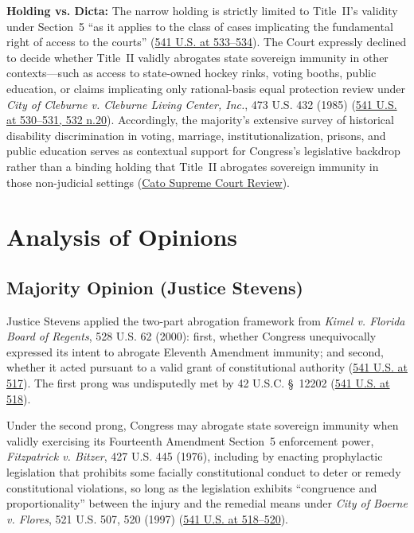 \documentclass[12pt]{article}
\begin{document}
\textbf{Holding vs. Dicta:} The narrow holding is strictly limited to Title~II's validity under Section~5 ``as it applies to the class of cases implicating the fundamental right of access to the courts'' (\href{https://www.law.cornell.edu/supremecourt/text/541/509}{541 U.S. at 533--534}). The Court expressly declined to decide whether Title~II validly abrogates state sovereign immunity in other contexts---such as access to state-owned hockey rinks, voting booths, public education, or claims implicating only rational-basis equal protection review under \textit{City of Cleburne v. Cleburne Living Center, Inc.}, 473 U.S. 432 (1985) (\href{https://www.law.cornell.edu/supremecourt/text/541/509}{541 U.S. at 530--531, 532 n.20}). Accordingly, the majority's extensive survey of historical disability discrimination in voting, marriage, institutionalization, prisons, and public education serves as contextual support for Congress's legislative backdrop rather than a binding holding that Title~II abrogates sovereign immunity in those non-judicial settings (\href{https://www.cato.org/supreme-court-review/2003-2004/tennessee-v-lane-how-illegitimate-power-negated-non-existent-immunity}{Cato Supreme Court Review}).

\section{Analysis of Opinions}

\subsection{Majority Opinion (Justice Stevens)}
Justice Stevens applied the two-part abrogation framework from \textit{Kimel v. Florida Board of Regents}, 528 U.S. 62 (2000): first, whether Congress unequivocally expressed its intent to abrogate Eleventh Amendment immunity; and second, whether it acted pursuant to a valid grant of constitutional authority (\href{https://www.law.cornell.edu/supremecourt/text/541/509}{541 U.S. at 517}). The first prong was undisputedly met by 42 U.S.C. \S~12202 (\href{https://www.law.cornell.edu/supremecourt/text/541/509}{541 U.S. at 518}).

Under the second prong, Congress may abrogate state sovereign immunity when validly exercising its Fourteenth Amendment Section~5 enforcement power, \textit{Fitzpatrick v. Bitzer}, 427 U.S. 445 (1976), including by enacting prophylactic legislation that prohibits some facially constitutional conduct to deter or remedy constitutional violations, so long as the legislation exhibits ``congruence and proportionality'' between the injury and the remedial means under \textit{City of Boerne v. Flores}, 521 U.S. 507, 520 (1997) (\href{https://www.law.cornell.edu/supremecourt/text/541/509}{541 U.S. at 518--520}).
\end{document}
